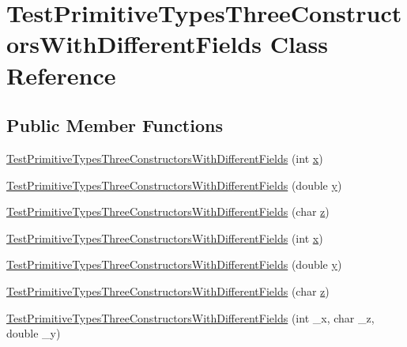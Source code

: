 \hypertarget{classTestPrimitiveTypesThreeConstructorsWithDifferentFields}{
\section{TestPrimitiveTypesThreeConstructorsWithDifferentFields Class Reference}
\label{classTestPrimitiveTypesThreeConstructorsWithDifferentFields}
}
\subsection*{Public Member Functions}
\begin{DoxyCompactItemize}
\item 
\hyperlink{classTestPrimitiveTypesThreeConstructorsWithDifferentFields_ad46a5caa83f37dd782c4e2754077ab47}{TestPrimitiveTypesThreeConstructorsWithDifferentFields} (int \hyperlink{classTestPrimitiveTypesThreeConstructorsWithDifferentFields_a252f09fdacfa1783ea30801827076fb1}{x})
\item 
\hyperlink{classTestPrimitiveTypesThreeConstructorsWithDifferentFields_a55d8ba9133e564c0db84389fde8d75a0}{TestPrimitiveTypesThreeConstructorsWithDifferentFields} (double \hyperlink{classTestPrimitiveTypesThreeConstructorsWithDifferentFields_aca6793749b2098bcd3cadd31e71f1080}{y})
\item 
\hyperlink{classTestPrimitiveTypesThreeConstructorsWithDifferentFields_ade958db1464a079b7095412897eb507c}{TestPrimitiveTypesThreeConstructorsWithDifferentFields} (char \hyperlink{classTestPrimitiveTypesThreeConstructorsWithDifferentFields_a112ee7f3b539bf2252e2847b57fa7267}{z})
\item 
\hyperlink{classTestPrimitiveTypesThreeConstructorsWithDifferentFields_ad46a5caa83f37dd782c4e2754077ab47}{TestPrimitiveTypesThreeConstructorsWithDifferentFields} (int \hyperlink{classTestPrimitiveTypesThreeConstructorsWithDifferentFields_a252f09fdacfa1783ea30801827076fb1}{x})
\item 
\hyperlink{classTestPrimitiveTypesThreeConstructorsWithDifferentFields_a55d8ba9133e564c0db84389fde8d75a0}{TestPrimitiveTypesThreeConstructorsWithDifferentFields} (double \hyperlink{classTestPrimitiveTypesThreeConstructorsWithDifferentFields_aca6793749b2098bcd3cadd31e71f1080}{y})
\item 
\hyperlink{classTestPrimitiveTypesThreeConstructorsWithDifferentFields_ade958db1464a079b7095412897eb507c}{TestPrimitiveTypesThreeConstructorsWithDifferentFields} (char \hyperlink{classTestPrimitiveTypesThreeConstructorsWithDifferentFields_a112ee7f3b539bf2252e2847b57fa7267}{z})
\item 
\hyperlink{classTestPrimitiveTypesThreeConstructorsWithDifferentFields_abba6842690bf7e9fe644bcfd6043a209}{TestPrimitiveTypesThreeConstructorsWithDifferentFields} (int \_\-x, char \_\-z, double \_\-y)
\end{DoxyCompactItemize}
